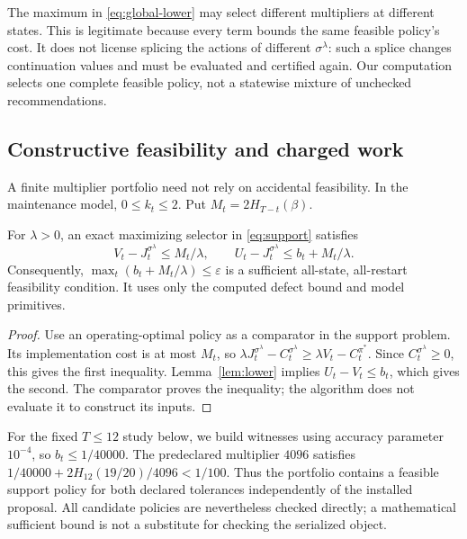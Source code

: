The maximum in \eqref{eq:global-lower} may select different multipliers at different states. This is legitimate because every term bounds the same feasible policy's cost. It does not license splicing the actions of different $\sigma^\lambda$: such a splice changes continuation values and must be evaluated and certified again. Our computation selects one complete feasible policy, not a statewise mixture of unchecked recommendations.

\subsection{Constructive feasibility and charged work}
A finite multiplier portfolio need not rely on accidental feasibility. In the maintenance model, $0\le k_t\le2$. Put $M_t=2H_{T-t}(\beta)$.
\begin{proposition}\label{prop:price}
For $\lambda>0$, an exact maximizing selector in \eqref{eq:support} satisfies
\begin{equation}\label{eq:pricebound}
 V_t-J_t^{\sigma^\lambda}\le M_t/\lambda,\qquad
 U_t-J_t^{\sigma^\lambda}\le b_t+M_t/\lambda.
\end{equation}
Consequently, $\max_t(b_t+M_t/\lambda)\le\varepsilon$ is a sufficient all-state, all-restart feasibility condition. It uses only the computed defect bound and model primitives.
\end{proposition}
\begin{proof}
Use an operating-optimal policy as a comparator in the support problem. Its implementation cost is at most $M_t$, so
$\lambda J_t^{\sigma^\lambda}-C_t^{\sigma^\lambda}
 \ge\lambda V_t-C_t^{\pi^*}$.
Since $C_t^{\sigma^\lambda}\ge0$, this gives the first inequality. Lemma~\ref{lem:lower} implies $U_t-V_t\le b_t$, which gives the second. The comparator proves the inequality; the algorithm does not evaluate it to construct its inputs.\end{proof}

For the fixed $T\le12$ study below, we build witnesses using accuracy parameter $10^{-4}$, so $b_t\le1/40000$. The predeclared multiplier $4096$ satisfies
$1/40000+2H_{12}(19/20)/4096<1/100$.
Thus the portfolio contains a feasible support policy for both declared tolerances independently of the installed proposal. All candidate policies are nevertheless checked directly; a mathematical sufficient bound is not a substitute for checking the serialized object.

